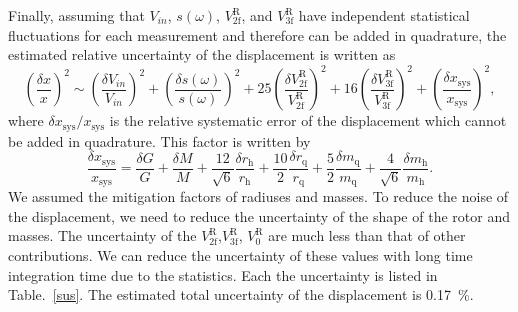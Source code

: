 \documentclass[A4]{spie}  %
\begin{document}
Finally, assuming that $V_{in}$, $s(\omega)$, $V^{\mathrm{R}}_{{\mathrm{2f}}}$, and $V^{\mathrm{R}}_{{\mathrm{3f}}}$ have independent statistical fluctuations for each measurement and therefore can be added in quadrature, the estimated relative uncertainty of the displacement is written as
 \footnotesize
\begin{equation}
\left( \frac{\delta x}{x} \right)^2 \!\sim \! \left( \!\frac{\delta V_{in}}{V_{in}}\! \right)^2+\left(\! \frac{\delta s(\omega)}{s(\omega)} \! \right)^2\!+\!25\!\left(\!\frac{\delta V^{\mathrm{R}}_{{\mathrm{2f}}}}{V^{\mathrm{R}}_{{\mathrm{2f}}}}\! \right)^2+16\!\left(\! \frac{\delta V^{\mathrm{R}}_{{\mathrm{3f}}}}{V^{\mathrm{R}}_{{\mathrm{3f}}}}\! \right)^2\!+ \left(\! \frac{\delta x_{\mathrm{sys}}}{x_{\mathrm{sys}}} \! \right)^2 \label{deltax},
\end{equation}
\normalsize
where $\delta x_{\mathrm{sys}}/x_{\mathrm{sys}}$ is the relative systematic error of the displacement which cannot be added in quadrature. This factor is written by
 \footnotesize
\begin{equation}
\frac{\delta x_{\mathrm{sys}}}{x_{\mathrm{sys}}}=\frac{\delta G}{G} + \frac{\delta M}{M} +\frac{12}{\sqrt{6}} \frac{\delta r_{\mathrm{h}}}{r_{\mathrm{h}}} +\frac{10}{2} \frac{\delta r_{\mathrm{q}}}{r_{\mathrm{q}}}  +\frac{5}{2} \frac{\delta m_{\mathrm{q}}}{m_{\mathrm{q}}} +\!\frac{4}{\sqrt{6}}  \! \frac{\delta m_{\mathrm{h}}}{m_{\mathrm{h}}}.
\end{equation}
\normalsize
We assumed the mitigation factors of radiuses and masses.
To reduce the noise of the displacement, we need to reduce the uncertainty of the shape of the rotor and masses.
The uncertainty of the $V^{\mathrm{R}}_{\mathrm{2f}}$,$V^{\mathrm{R}}_{\mathrm{3f}}$, $V^{\mathrm{R}}_{0}$ are much less than that of other contributions. We can reduce the uncertainty of these values with long time integration time due to the statistics. Each the uncertainty is listed in Table.~\ref{sus}. The estimated  total uncertainty of the displacement is 0.17~\%.
\end{document}
